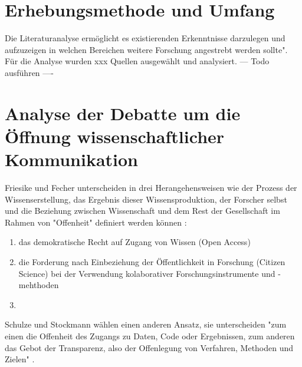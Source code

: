 \section{Erhebungsmethode und Umfang} 

Die Literaturanalyse ermöglicht es existierenden Erkenntnisse darzulegen und aufzuzeigen in welchen Bereichen weitere Forschung angestrebt werden sollte"\cite{webster2002analyzing}. Für die Analyse wurden xxx Quellen ausgewählt und analysiert. --- Todo ausführen ----

\section{Analyse der Debatte um die Öffnung wissenschaftlicher Kommunikation} 

Friesike und Fecher unterscheiden in drei Herangehensweisen wie der Prozess der Wissenserstellung, das Ergebnis dieser Wissensproduktion, der Forscher selbst und die Beziehung zwischen Wissenschaft und dem Rest der Gesellschaft im Rahmen von "Offenheit" definiert werden können \cite{cite:9}:
\begin{enumerate}
\item das demokratische Recht auf Zugang von Wissen (Open Access)
\item die Forderung nach Einbeziehung der Öffentlichkeit in Forschung (Citizen Science) bei der Verwendung kolaborativer Forschungsinstrumente und -mehthoden
\item 
\end{enumerate}

Schulze und Stockmann wählen einen anderen Ansatz, sie unterscheiden "zum einen die Offenheit des Zugangs zu Daten, Code oder Ergebnissen, zum anderen das Gebot der Transparenz, also der Offenlegung von Verfahren, Methoden und Zielen" \cite{schulze_2013_open}.

